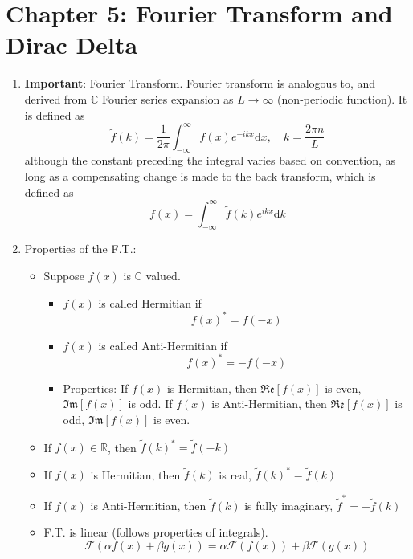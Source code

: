 \documentclass{article}
\begin{document}
\section{Chapter 5: Fourier Transform and Dirac Delta}
\begin{enumerate}
\item \textbf{Important}: Fourier Transform. Fourier transform is analogous to, and derived from $\mathbb{C}$ Fourier series expansion as $L\rightarrow\infty$ (non-periodic function). It is defined as
\begin{equation}
\tilde{f}(k)=\frac{1}{2\pi}\int_{-\infty}^{\infty}f(x)e^{-ikx}\mathrm{d}x,\quad k=\frac{2\pi n}{L}
\end{equation}
although the constant preceding the integral varies based on convention, as long as a compensating change is made to the back transform, which is defined as
\begin{equation}
f(x)=\int_{-\infty}^{\infty}\tilde{f}(k)e^{ikx}\mathrm{d}k
\end{equation}
\item Properties of the F.T.:
\begin{itemize}
\item Suppose $f(x)$ is $\mathbb{C}$ valued.
\begin{itemize}
\item $f(x)$ is called Hermitian if
\begin{equation}
f(x)^{*}=f(-x)
\end{equation}
\item $f(x)$ is called Anti-Hermitian if
\begin{equation}
f(x)^*=-f(-x)
\end{equation}
\item Properties: If $f(x)$ is Hermitian, then $\mathfrak{Re}[f(x)]$ is even, $\mathfrak{Im}[f(x)]$ is odd. If $f(x)$ is Anti-Hermitian, then $\mathfrak{Re}[f(x)]$ is odd, $\mathfrak{Im}[f(x)]$ is even.
\end{itemize}
\item If $f(x)\in \mathbb{R}$, then $\tilde{f}(k)^*=\tilde{f}(-k)$
\item If $f(x)$ is Hermitian, then $\tilde{f}(k)$ is real, $\tilde{f}(k)^*=\tilde{f}(k)$
\item If $f(x)$ is Anti-Hermitian, then $\tilde{f}(k)$ is fully imaginary, $\tilde{f}^*=-\tilde{f}(k)$
\item F.T. is linear (follows properties of integrals).
\begin{equation}
\mathcal{F}(\alpha f(x) + \beta g(x))= \alpha \mathcal{F}(f(x))+\beta \mathcal{F}(g(x))

\end{equation}
\end{itemize}
\end{enumerate}
\end{document}
